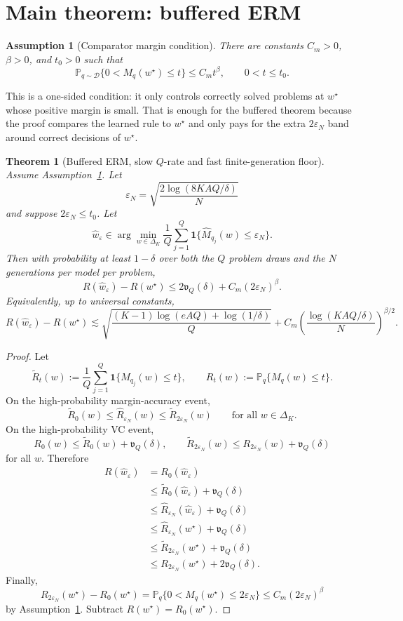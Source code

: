 \documentclass[11pt]{article}
\newtheorem{theorem}{Theorem}
\newtheorem{assumption}{Assumption}
\newcommand{\D}{\mathcal D}
\newcommand{\Pp}{\mathbb P}
\newcommand{\one}{\mathbf 1}
\newcommand{\what}{\widehat w}
\newcommand{\wstar}{w^\star}
\newcommand{\eps}{\varepsilon}
\begin{document}
\section{Main theorem: buffered ERM}

\begin{assumption}[Comparator margin condition]
\label{ass:comp-margin}
There are constants $C_m>0$, $\beta>0$, and $t_0>0$ such that
\[
\Pp_{q\sim\D}\{0<M_q(\wstar)\le t\}
\le
C_m t^\beta,
\qquad 0<t\le t_0.
\]
\end{assumption}

This is a one-sided condition: it only controls correctly solved problems at $\wstar$ whose positive margin is small.  That is enough for the buffered theorem because the proof compares the learned rule to $\wstar$ and only pays for the extra $2\eps_N$ band around correct decisions of $\wstar$.

\begin{theorem}[Buffered ERM, slow $Q$-rate and fast finite-generation floor]
\label{thm:buffered-main}
Assume Assumption~\ref{ass:comp-margin}.  Let
\[
\eps_N=\sqrt{\frac{2\log(8KAQ/\delta)}{N}}
\]
and suppose $2\eps_N\le t_0$.  Let
\[
\what_\eps\in\arg\min_{w\in\Delta_K}
\frac1Q\sum_{j=1}^Q\one\{\widehat M_{q_j}(w)\le\eps_N\}.
\]
Then with probability at least $1-\delta$ over both the $Q$ problem draws and the $N$ generations per model per problem,
\[
R(\what_\eps)-R(\wstar)
\le
2\mathfrak v_Q(\delta)
+
C_m(2\eps_N)^\beta.
\]
Equivalently, up to universal constants,
\[
\boxed{
R(\what_\eps)-R(\wstar)
\lesssim
\sqrt{\frac{(K-1)\log(eAQ)+\log(1/\delta)}{Q}}
+
C_m
\left(\frac{\log(KAQ/\delta)}{N}\right)^{\beta/2}.
}
\]
\end{theorem}

\begin{proof}
Let
\[
\widetilde R_t(w):=\frac1Q\sum_{j=1}^Q\one\{M_{q_j}(w)\le t\},
\qquad
R_t(w):=\Pp_q\{M_q(w)\le t\}.
\]
On the high-probability margin-accuracy event,
\[
\widetilde R_0(w)
\le
\widehat R_{\eps_N}(w)
\le
\widetilde R_{2\eps_N}(w)
\qquad
\text{for all }w\in\Delta_K.
\]
On the high-probability VC event,
\[
R_0(w)\le \widetilde R_0(w)+\mathfrak v_Q(\delta),
\qquad
\widetilde R_{2\eps_N}(w)\le R_{2\eps_N}(w)+\mathfrak v_Q(\delta)
\]
for all $w$.  Therefore
\begin{align*}
R(\what_\eps)
&=R_0(\what_\eps)\\
&\le \widetilde R_0(\what_\eps)+\mathfrak v_Q(\delta)\\
&\le \widehat R_{\eps_N}(\what_\eps)+\mathfrak v_Q(\delta)\\
&\le \widehat R_{\eps_N}(\wstar)+\mathfrak v_Q(\delta)\\
&\le \widetilde R_{2\eps_N}(\wstar)+\mathfrak v_Q(\delta)\\
&\le R_{2\eps_N}(\wstar)+2\mathfrak v_Q(\delta).
\end{align*}
Finally,
\[
R_{2\eps_N}(\wstar)-R_0(\wstar)
=
\Pp_q\{0<M_q(\wstar)\le 2\eps_N\}
\le
C_m(2\eps_N)^\beta
\]
by Assumption~\ref{ass:comp-margin}.  Subtract $R(\wstar)=R_0(\wstar)$.
\end{proof}
\end{document}
